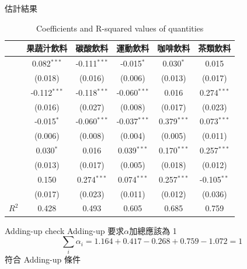 \documentclass[12pt]{beamer}
\begin{document}
\begin{frame}{估計結果}
	\begin{table}[h]
		\begin{center} \footnotesize{
		\begin{tabular}{lccccc}
			\hline
			 & 果蔬汁飲料 & 碳酸飲料 & 運動飲料 & 咖啡飲料 & 茶類飲料 \\
			\hline
			& \phantom{3}0.082$^{***}$ & \phantom{3}-0.111$^{***}$ & \phantom{1}-0.015$^{*}$ & \phantom{1}0.030$^{*}$ & 0.015 \\[-1.5ex]
			\raisebox{2ex}{$\gamma_{\text{果蔬汁}}$} & (0.018) & (0.016) & (0.006) & (0.013) & (0.017) \\[0ex]
			& \phantom{3}-0.112$^{***}$ & \phantom{3}-0.118$^{***}$ & \phantom{3}-0.060$^{***}$ & 0.016 & \phantom{3}0.274$^{***}$ \\[-2ex]
			\raisebox{2ex}{$\gamma_{\text{碳酸}}$} & (0.016) & (0.027) & (0.008) & (0.017) & (0.023) \\[0ex]
			& \phantom{1}-0.015$^{*}$ & \phantom{3}-0.060$^{***}$ & \phantom{3}-0.037$^{***}$ & \phantom{3}0.379$^{***}$ & \phantom{3}0.073$^{***}$ \\[-2ex]
			\raisebox{2ex}{$\gamma_{\text{運動}}$} & (0.006) & (0.008) & (0.004) & (0.005) & (0.011) \\[0ex]
			& \phantom{1}0.030$^{*}$ & 0.016 & \phantom{3}0.039$^{***}$ & \phantom{3}0.170$^{***}$ & \phantom{3}0.257$^{***}$ \\[-2ex]
			\raisebox{2ex}{$\gamma_{\text{咖啡}}$} & (0.013) & (0.017) & (0.005) & (0.018) & (0.012) \\[0ex]
			& 0.150 & \phantom{3}0.274$^{***}$  & \phantom{3}0.074$^{***}$ & \phantom{3}0.257$^{***}$ & \phantom{2}-0.105$^{**}$\\[-2ex]
			\raisebox{2ex}{$\gamma_{\text{茶類}}$} & (0.017) & (0.023) & (0.011) & (0.012) & (0.036) \\[0ex]
			\hline
			$R^2$ & 0.428 & 0.493 & 0.605 & 0.685 & 0.759 \\
			\hline
		\end{tabular} }
		\end{center}
		\caption{\footnotesize Coefficients and R-squared values of quantities}
		\label{turns2}
	\end{table}

\end{frame}

\begin{frame}{Adding-up check}
	Adding-up 要求$\alpha$加總應該為 1
	\[
		\sum_i \alpha_i = 1.164+0.417 -0.268+ 0.759-1.072 = 1
	\]
	符合 Adding-up 條件
\end{frame}
\end{document}

